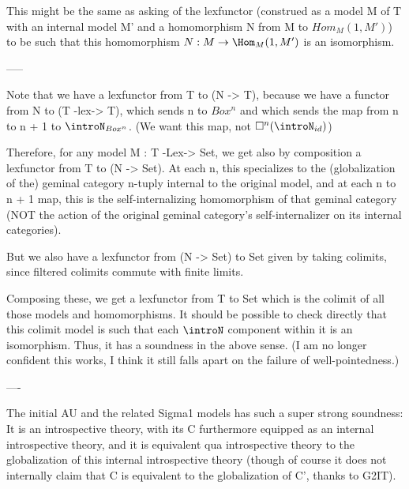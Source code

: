 This might be the same as asking of the lexfunctor (construed as a model M of T with an internal model M' and a homomorphism N from M to $Hom_M(1, M')$) to be such that this homomorphism $N : M \to \Hom_M(1, M')$ is an isomorphism.

-----

Note that we have a lexfunctor from T to (N -> T), because we have a functor from N to (T -lex-> T), which sends n to $Box^n$ and which sends the map from n to n + 1 to $\introN_{Box^n}$. (We want this map, not $\Box^n (\introN_{id})$)

Therefore, for any model M : T -Lex-> Set, we get also by composition a lexfunctor from T to (N -> Set). At each n, this specializes to the (globalization of the) geminal category n-tuply internal to the original model, and at each n to n + 1 map, this is the self-internalizing homomorphism of that geminal category (NOT the action of the original geminal category's self-internalizer on its internal categories).

But we also have a lexfunctor from (N -> Set) to Set given by taking colimits, since filtered colimits commute with finite limits.

Composing these, we get a lexfunctor from T to Set which is the colimit of all those models and homomorphisms. It should be possible to check directly that this colimit model is such that each $\introN$ component within it is an isomorphism. Thus, it has a soundness in the above sense. (I am no longer confident this works, I think it still falls apart on the failure of well-pointedness.)

----

The initial AU and the related Sigma1 models has such a super strong soundness: It is an introspective theory, with its C furthermore equipped as an internal introspective theory, and it is equivalent qua introspective theory to the globalization of this internal introspective theory (though of course it does not internally claim that C is equivalent to the globalization of C', thanks to G2IT).


